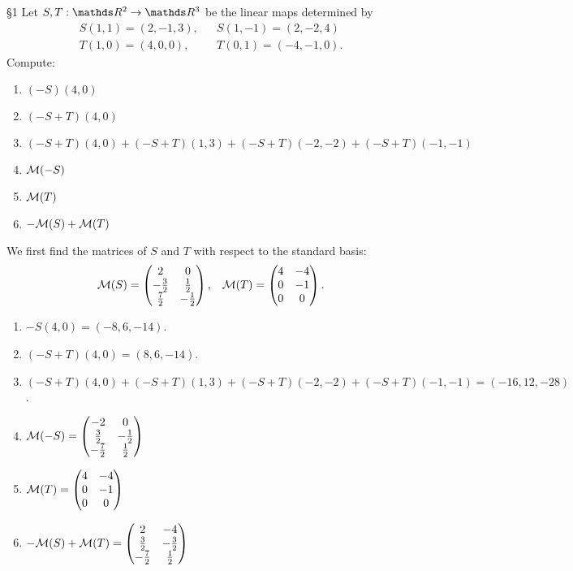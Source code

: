 \documentclass{review-sheet}
\begin{document}
\begin{problem}{\S 1}
  Let $S,T:\R^2\to \R^3$ be the linear maps determined by
  \begin{align*}
    S(1,1)=(2,-1,3), && S(1,-1) = (2,-2,4)\\
    T(1,0)=(4,0,0), && T(0,1) = (-4,-1,0)
  .\end{align*}
  Compute:
  \begin{enumerate}[label=(\alph*)]
    \item $(-S)(4,0)$
    \item  $(-S+T)(4,0)$
    \item  $(-S+T)(4,0)+(-S+T)(1,3)+(-S+T)(-2,-2)+(-S+T)(-1,-1)$ 
    \item $ \mathcal{M}(-S)$
    \item $\mathcal{M}(T)$
    \item $-\mathcal{M}(S)+\mathcal{M}(T)$
  \end{enumerate}
\end{problem}

\begin{solution}
  We first find the matrices of $S$ and $T$ with respect to the standard basis:
  \begin{align*}
    \mathcal{M}(S)=\begin{pmatrix} 2&0\\-\frac{3}{2}&\frac{1}{2}\\\frac{7}{2}&-\frac{1}{2}
      \end{pmatrix},&& \mathcal{M}(T)=\begin{pmatrix} 4&-4\\0&-1\\0&0 \end{pmatrix} 
  .\end{align*}

  \begin{enumerate}[label=(\alph*)]
    \item $-S(4,0)=(-8,6,-14)$.
    \item  $(-S+T)(4,0)=(8,6,-14)$.
    \item  $(-S+T)(4,0)+(-S+T)(1,3)+(-S+T)(-2,-2)+(-S+T)(-1,-1)=(-16,12,-28)$.
    \item $\mathcal{M}(-S)=\begin{pmatrix} -2&0\\\frac{3}{2}&-\frac{1}{2}\\-\frac{7}{2}&\frac{1}{2} \end{pmatrix} $ 
    \item $\mathcal{M}(T)=\begin{pmatrix} 4&-4\\0&-1\\0&0 \end{pmatrix}$
    \item $-\mathcal{M}(S)+\mathcal{M}(T)=\begin{pmatrix}
      2&-4\\\frac{3}{2}&-\frac{3}{2}\\-\frac{7}{2}&\frac{1}{2} \end{pmatrix} $
  \end{enumerate}
\end{solution}
\end{document}
